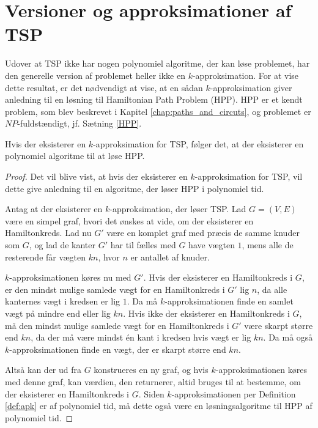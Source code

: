 \section{Versioner og approksimationer af TSP}
Udover at TSP ikke har nogen polynomiel algoritme, der kan løse problemet, har den generelle version af problemet heller ikke en $k$-approksimation.
For at vise dette resultat, er det nødvendigt at vise, at en sådan $k$-approksimation giver anledning til en løsning til Hamiltonian Path Problem (HPP).
HPP er et kendt problem, som blev beskrevet i Kapitel \ref{chap:paths_and_circuts}, og problemet er $NP$-fuldstændigt, jf. Sætning \ref{HPP}.

\begin{thm} \label{thm:TSP_HPP}
	Hvis der eksisterer en $k$-approksimation for TSP, følger det, at der eksisterer en polynomiel algoritme til at løse HPP. 
\end{thm}

\begin{proof}
	Det vil blive vist, at hvis der eksisterer en $k$-approksimation for TSP, vil dette give anledning til en algoritme, der løser HPP i polynomiel tid.

	Antag at der eksisterer en $k$-approksimation, der løser TSP.
	Lad $G=(V,E)$ være en simpel graf, hvori det ønskes at vide, om der eksisterer en Hamiltonkreds.
	Lad nu $G'$ være en komplet graf med præcis de samme knuder som $G$, og lad de kanter $G'$ har til fælles med $G$ have vægten $1$, mens alle de resterende får vægten $kn$, hvor $n$ er antallet af knuder.

	$k$-approksimationen køres nu med $G'$.
	Hvis der eksisterer en Hamiltonkreds i $G$, er den mindst mulige samlede vægt for en Hamiltonkreds i $G'$ lig $n$, da alle kanternes vægt i kredsen er lig $1$.
	Da må $k$-approksimationen finde en samlet vægt på mindre end eller lig $kn$.
	Hvis ikke der eksisterer en Hamiltonkreds i $G$, må den mindst mulige samlede vægt for en Hamiltonkreds i $G'$ være skarpt større end $kn$, da der må være mindst én kant i kredsen hvis vægt er lig $kn$.
	Da må også $k$-approksimationen finde en vægt, der er skarpt større end $kn$.

	Altså kan der ud fra $G$ konstrueres en ny graf, og hvis $k$-approksimationen køres med denne graf, kan værdien, den returnerer, altid bruges til at bestemme, om der eksisterer en Hamiltonkreds i $G$.
	Siden $k$-approksimationen per Definition \ref{def:apk} er af polynomiel tid, må dette også være en løsningsalgoritme til HPP af polynomiel tid.
\end{proof}


